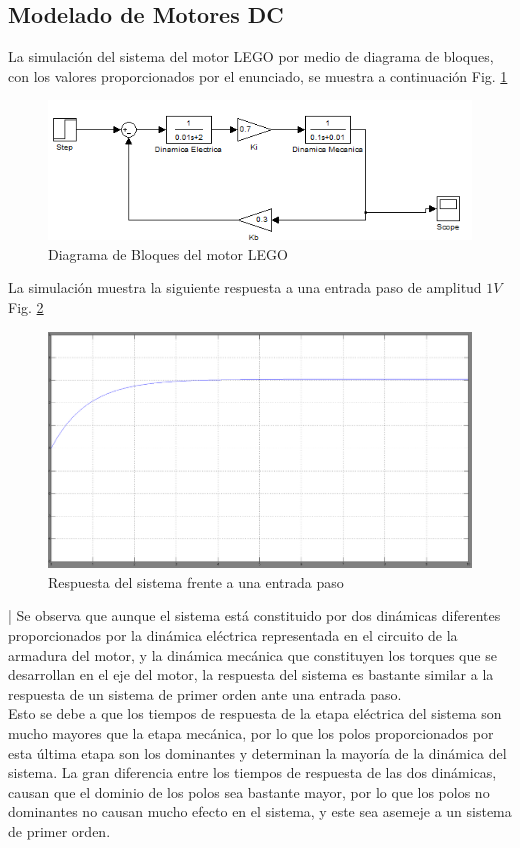 \documentclass[twocolumn]{IEEEtran}
\begin{document}
\subsection{Modelado de Motores DC}
\noindent
La simulación del sistema del motor LEGO por medio de diagrama de bloques, con los valores proporcionados por el enunciado, se muestra a continuación Fig. \ref{fig9}
\begin{figure}[H]
	\centering
		\includegraphics[scale=0.4]{figure9.png}
	\caption{Diagrama de Bloques del motor LEGO}
	\label{fig9}
\end{figure}
\noindent
La simulación muestra la siguiente respuesta a una entrada paso de amplitud $1V$ Fig. \ref{fig10}
\begin{figure}[H]
	\centering
		\includegraphics[scale=0.15]{figure10.png}
	\caption{Respuesta del sistema frente a una entrada paso}
	\label{fig10}
\end{figure}
\noindent|
Se observa que aunque el sistema está constituido por dos dinámicas diferentes proporcionados por la dinámica eléctrica representada en el circuito de la armadura del motor, y la dinámica mecánica que constituyen los torques que se desarrollan en el eje del motor, la respuesta del sistema es bastante similar a la respuesta de un sistema de primer orden ante una entrada paso.\\
Esto se debe a que los tiempos de respuesta de la etapa eléctrica del sistema son mucho mayores que la etapa mecánica, por lo que los polos proporcionados por esta última etapa son los dominantes y determinan la mayoría de la dinámica del sistema. La gran diferencia entre los tiempos de respuesta de las dos dinámicas, causan que el dominio de los polos sea bastante mayor, por lo que los polos no dominantes no causan mucho efecto en el sistema, y este sea asemeje a un sistema de primer orden.\\\\
\end{document}
